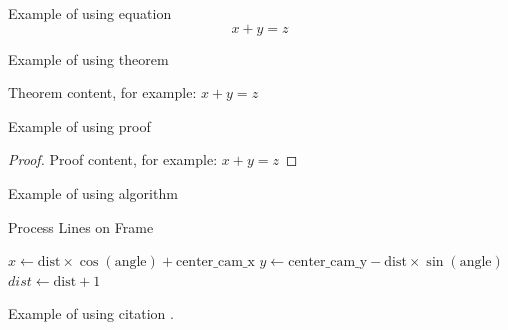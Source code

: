Example of using equation 
\begin{equation}
    x + y = z
\end{equation}

Example of using theorem
\begin{theorem}
    Theorem content, for example: $x + y = z$
\end{theorem}

Example of using proof
\begin{proof}
    Proof content, for example: $x + y = z$
\end{proof}

Example of using algorithm
\begin{algorithm}[H]
    \caption{Process Lines on Frame}\label{alg:process_lines}
    \begin{algorithmic}[1]
        \State {}
            \State {}
                \State $x \gets \text{dist} \times \cos(\text{angle}) + \text{center\_cam\_x}$
                \State $y \gets \text{center\_cam\_y} - \text{dist} \times \sin(\text{angle})$
                    \State {}
                \EndIf
                \State $dist \gets \text{dist} + 1$
            \EndFor
        \EndFor
    \EndProcedure
    \end{algorithmic}
\end{algorithm}

Example of using citation \cite{ref_url1}.

